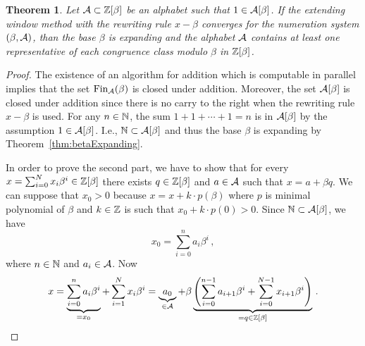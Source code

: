 \documentclass{article}
\newtheorem{theo}{Theorem}
\begin{document}
\begin{theo}
Let $\mathcal{A}\subset \mathbb{Z}[\beta]$ be an alphabet such that $1\in \mathcal{A}[\beta]$. If the extending window method with the rewriting rule $x-\beta$ converges for the numeration system $(\beta, \mathcal{A})$, than the base $\beta$ is expanding and the alphabet $\mathcal{A}$ contains at least one representative of each congruence class modulo $\beta$ in $\mathbb{Z}[\beta]$. 
\end{theo}
\begin{proof}
The existence of an algorithm for addition which is computable in parallel implies that the set $\text{Fin}_{\mathcal{A}}(\beta)$ is closed under addition. Moreover, the set $\mathcal{A}[\beta]$ is closed under addition since there is no carry to the right when the rewriting rule $x-\beta$ is used. For any $n\in\mathbb{N}$, the sum $1+1+\cdots +1=n$ is in $\mathcal{A}[\beta]$ by the assumption $1\in \mathcal{A}[\beta]$. I.e., $\mathbb{N}\subset \mathcal{A}[\beta]$ and thus the base $\beta$ is expanding by Theorem~\ref{thm:betaExpanding}.

In order to prove the second part, we have to show that for every $x=\sum_{i=0}^N x_i \beta^i \in\mathbb{Z}[\beta]$ there exists $q\in\mathbb{Z}[\beta]$ and $a\in\mathcal{A}$ such that $x=a+\beta q$. We can suppose that $x_0> 0$ because $x=x+k\cdot p(\beta)$ where $p$ is minimal polynomial of $\beta$ and  $k\in\mathbb{Z}$ is such that $x_0+k\cdot p(0)>0$. Since $\mathbb{N}\subset \mathcal{A}[\beta]$, we have
$$
x_0=\sum_{i=0}^{n}a_i\beta^i\,,
    $$
    where $n\in\mathbb{N}$ and $a_i\in\mathcal{A}$. Now
    $$
    x=\underbrace{\sum_{i=0}^{n}a_i\beta^i}_{=x_0} + \sum_{i=1}^N x_i \beta^i=\underbrace{a_0}_{\in\mathcal{A}} + \beta \underbrace{\left(\sum_{i=0}^{n-1}a_{i+1}\beta^i + \sum_{i=0}^{N-1} x_{i+1} \beta^i\right)}_{=q\in\mathbb{Z}[\beta]}\,.
    $$
\end{proof}
\end{document}
